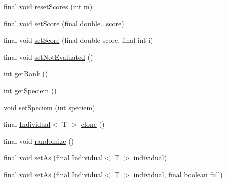 \begin{DoxyCompactItemize}
final void \hyperlink{classjenes_1_1population_1_1_individual_3_01_t_01extends_01_chromosome_01_4_ad2b80a4fa7401737fef5d9fbebf7588e}{reset\-Scores} (int m)
\item 
final void \hyperlink{classjenes_1_1population_1_1_individual_3_01_t_01extends_01_chromosome_01_4_a6f459ca1de55083c73390b4474271539}{set\-Score} (final double...\-score)
\item 
final void \hyperlink{classjenes_1_1population_1_1_individual_3_01_t_01extends_01_chromosome_01_4_a0388610de8d27632d932de85904d18e4}{set\-Score} (final double score, final int i)
\item 
final void \hyperlink{classjenes_1_1population_1_1_individual_3_01_t_01extends_01_chromosome_01_4_aede2854b691153950593a92a69cad856}{set\-Not\-Evaluated} ()
\item 
int \hyperlink{classjenes_1_1population_1_1_individual_3_01_t_01extends_01_chromosome_01_4_a42c65137e521bc9cd81448f7c27dccd2}{get\-Rank} ()
\item 
int \hyperlink{classjenes_1_1population_1_1_individual_3_01_t_01extends_01_chromosome_01_4_aed3f28eb6e9ea75f5dd58dc981180559}{get\-Speciem} ()
\item 
void \hyperlink{classjenes_1_1population_1_1_individual_3_01_t_01extends_01_chromosome_01_4_a52068a99fee4d8b7e5bc51c4d2c068cd}{set\-Speciem} (int speciem)
\item 
final \hyperlink{classjenes_1_1population_1_1_individual_3_01_t_01extends_01_chromosome_01_4_aaef7161bf62cee0ac95f079394fdac9f}{Individual}$<$ T $>$ \hyperlink{classjenes_1_1population_1_1_individual_3_01_t_01extends_01_chromosome_01_4_acc11569b9577fe227751297e26d719df}{clone} ()
\item 
final void \hyperlink{classjenes_1_1population_1_1_individual_3_01_t_01extends_01_chromosome_01_4_aa15396a9c24a33b93ad1b7a332b92cfb}{randomize} ()
\item 
final void \hyperlink{classjenes_1_1population_1_1_individual_3_01_t_01extends_01_chromosome_01_4_abf8f090558f25a8479a1187d4f53e8d7}{set\-As} (final \hyperlink{classjenes_1_1population_1_1_individual_3_01_t_01extends_01_chromosome_01_4_aaef7161bf62cee0ac95f079394fdac9f}{Individual}$<$ T $>$ individual)
\item 
final void \hyperlink{classjenes_1_1population_1_1_individual_3_01_t_01extends_01_chromosome_01_4_a5d41ad20ea167e591b4df69883e3ab84}{set\-As} (final \hyperlink{classjenes_1_1population_1_1_individual_3_01_t_01extends_01_chromosome_01_4_aaef7161bf62cee0ac95f079394fdac9f}{Individual}$<$ T $>$ individual, final boolean full)

\end{DoxyCompactItemize}
